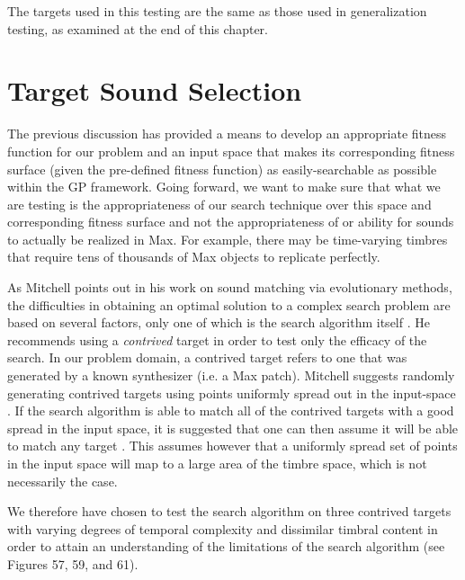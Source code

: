 \documentclass[12pt]{report} 	%
\numberwithin{figure}{chapter}
\numberwithin{table}{chapter}
\numberwithin{equation}{chapter}
\begin{document}
\begin{flushleft}
The targets used in this testing are the same as those used in generalization testing, as examined at the end of this chapter.

\section{Target Sound Selection}

The previous discussion has provided a means to develop an appropriate fitness function for our problem and an input space that makes its corresponding fitness surface (given the pre-defined fitness function) as easily-searchable as possible within the GP framework. Going forward, we want to make sure that what we are testing is the appropriateness of our search technique over this space and corresponding fitness surface and not the appropriateness of or ability for sounds to actually be realized in Max. For example, there may be time-varying timbres that require tens of thousands of Max objects to replicate perfectly.

As Mitchell points out in his work on sound matching via evolutionary methods, the difficulties in obtaining an optimal solution to a complex search problem are based on several factors, only one of which is the search algorithm itself \cite[p. 1]{Mitchell:2007fe}. He recommends using a \textit{contrived} target in order to test only the efficacy of the search. In our problem domain, a contrived target refers to one that was generated by a known synthesizer (i.e. a Max patch). Mitchell suggests randomly generating contrived targets using points uniformly spread out in the input-space \cite[p. 2]{Mitchell:2007fe}. If the search algorithm is able to match all of the contrived targets with a good spread in the input space, it is suggested that one can then assume it will be able to match any target \cite[p. 2]{Mitchell:2007fe}. This assumes however that a uniformly spread set of points in the input space will map to a large area of the timbre space, which is not necessarily the case.

We therefore have chosen to test the search algorithm on three contrived targets with varying degrees of temporal complexity and dissimilar timbral content in order to attain an understanding of the limitations of the search algorithm (see Figures 57, 59, and 61). 


\end{flushleft}
\end{document}
